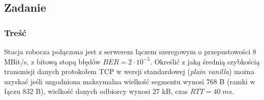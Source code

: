 			

	\subsection{Zadanie}
		\subsubsection{Treść}
			Stacja robocza połączona jest z serwerem łączem szeregowym o przepustowości 8 MBit/s, z bitową stopą błędów $ BER=2\cdot 10^{-5} $. Określić z jaką średnią szybkością transmisji danych protokołem TCP w wersji standardowej (\emph{plain vanilla}) można uzyskać jeśli uzgodniona maksymalna wielkość segmentu wynosi 768 B (ramki w łączu 832 B), wielkość danych odbiorcy wynosi 27 kB, czas $ RTT=40\;ms $.
